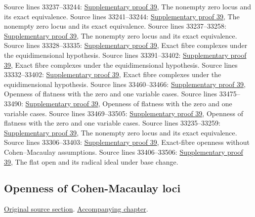 \begin{AlgebraSourceRoutes}
 Source lines 33237--33244: \hyperlink{algebra_open_flat_notes_20260928}{Supplementary proof 39}, The nonempty zero locus and its exact equivalence.
 Source lines 33241--33244: \hyperlink{algebra_open_flat_notes_20260928}{Supplementary proof 39}, The nonempty zero locus and its exact equivalence.
 Source lines 33237--33258: \hyperlink{algebra_open_flat_notes_20260928}{Supplementary proof 39}, The nonempty zero locus and its exact equivalence.
 Source lines 33328--33335: \hyperlink{algebra_open_flat_notes_20260928}{Supplementary proof 39}, Exact fibre complexes under the equidimensional hypothesis.
 Source lines 33391--33402: \hyperlink{algebra_open_flat_notes_20260928}{Supplementary proof 39}, Exact fibre complexes under the equidimensional hypothesis.
 Source lines 33332--33402: \hyperlink{algebra_open_flat_notes_20260928}{Supplementary proof 39}, Exact fibre complexes under the equidimensional hypothesis.
 Source lines 33460--33466: \hyperlink{algebra_open_flat_notes_20260928}{Supplementary proof 39}, Openness of flatness with the zero and one variable cases.
 Source lines 33475--33490: \hyperlink{algebra_open_flat_notes_20260928}{Supplementary proof 39}, Openness of flatness with the zero and one variable cases.
 Source lines 33469--33505: \hyperlink{algebra_open_flat_notes_20260928}{Supplementary proof 39}, Openness of flatness with the zero and one variable cases.
 Source lines 33235--33259: \hyperlink{algebra_open_flat_notes_20260928}{Supplementary proof 39}, The nonempty zero locus and its exact equivalence.
 Source lines 33306--33403: \hyperlink{algebra_open_flat_notes_20260928}{Supplementary proof 39}, Exact-fibre openness without Cohen–Macaulay assumptions.
 Source lines 33406--33506: \hyperlink{algebra_open_flat_notes_20260928}{Supplementary proof 39}, The flat open and its radical ideal under base change.
\end{AlgebraSourceRoutes}

\subsection{Openness of Cohen-Macaulay loci}
\hypertarget{algebra-source-section-CM-open}{}
\noindent\href{https://github.com/stacks/stacks-project/blob/a04446e57ec1fbc252a871afcec7752fb2807b14/algebra.tex\#L33515}{Original source section}. \href{algebra.pdf\#nameddest=section-CM-open}{Accompanying chapter}.

